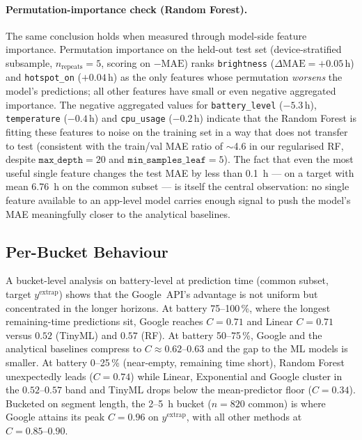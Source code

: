 \documentclass[conference]{IEEEtran}
\begin{document}
\paragraph{Permutation-importance check (Random Forest).}
The same conclusion holds when measured through model-side feature
importance. Permutation importance on the held-out test set
(device-stratified subsample, $n_{\text{repeats}}{=}5$, scoring on
$-\text{MAE}$) ranks \texttt{brightness} ($\Delta\text{MAE}{=}{+}0.05$\,h)
and \texttt{hotspot\_on} ($+0.04$\,h) as the only features whose
permutation \emph{worsens} the model's predictions; all other features
have small or even negative aggregated importance. The negative
aggregated values for \texttt{battery\_level} ($-5.3$\,h),
\texttt{temperature} ($-0.4$\,h) and \texttt{cpu\_usage} ($-0.2$\,h)
indicate that the Random Forest is fitting these features to noise
on the training set in a way that does not transfer to test
(consistent with the train/val MAE ratio of $\sim$4.6 in our
regularised RF, despite $\texttt{max\_depth}{=}20$ and
$\texttt{min\_samples\_leaf}{=}5$). The fact that even the most useful
single feature changes the test MAE by less than \SI{0.1}{\hour} ---
on a target with mean \SI{6.76}{\hour} on the common subset --- is
itself the central observation: no single feature available to an
app-level model carries enough signal to push the model's MAE
meaningfully closer to the analytical baselines.

\subsection{Per-Bucket Behaviour}
A bucket-level analysis on battery-level at prediction time
(common subset, target $y^{\text{extrap}}$) shows that the
Google~API's advantage is not uniform but concentrated in the longer
horizons. At battery 75--100\,\%, where the longest remaining-time
predictions sit, Google reaches $C{=}0.71$ and Linear $C{=}0.71$ versus
$0.52$ (TinyML) and $0.57$ (RF). At battery 50--75\,\%, Google and the
analytical baselines compress to $C{\approx}0.62\text{--}0.63$ and the
gap to the ML models is smaller. At battery 0--25\,\%
(near-empty, remaining time short), Random Forest unexpectedly leads
($C{=}0.74$) while Linear, Exponential and Google cluster in the
$0.52\text{--}0.57$ band and TinyML drops below the mean-predictor
floor ($C{=}0.34$). Bucketed on segment length, the 2--\SI{5}{\hour}
bucket ($n{=}820$ common) is where Google attains its peak $C{=}0.96$
on $y^{\text{extrap}}$, with all other methods at $C{=}0.85\text{--}0.90$.
\end{document}
